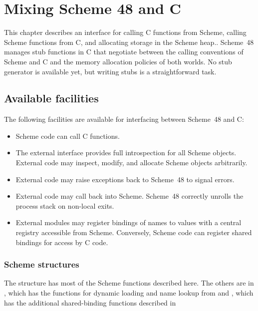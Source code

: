 \chapter{Mixing Scheme 48 and C}
\label{external-chapter}

This chapter describes an interface for calling C functions
 from Scheme, calling Scheme functions from C, and allocating
 storage in the Scheme heap..
Scheme~48 manages stub functions in C that
 negotiate between the calling conventions of Scheme and C and the
 memory allocation policies of both worlds.
No stub generator is available yet, but writing stubs is a straightforward task.

\section{Available facilities}
\label{sec:facilities}

The following facilities are available for interfacing between
 Scheme~48 and C:
%
\begin{itemize}
\item Scheme code can call C functions.
\item The external interface provides full introspection for all
  Scheme objects.  External code may inspect, modify, and allocate
  Scheme objects arbitrarily.
\item External code may raise exceptions back to Scheme~48 to
  signal errors.
\item External code may call back into Scheme.  Scheme~48
  correctly unrolls the process stack on non-local exits.
\item External modules may register bindings of names to values with a 
  central registry accessible from
  Scheme.  Conversely, Scheme code can register shared
  bindings for access by C code.
\end{itemize}
%

\subsection{Scheme structures}

The structure  has 
 most of the Scheme functions described here.
The others are in 
 , which has the functions for dynamic loading and
 name lookup from
 and , which has the additional shared-binding functions
 described in

